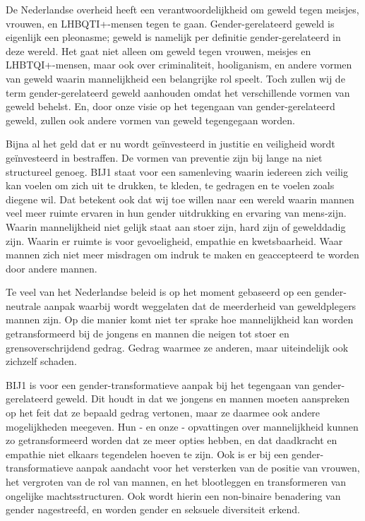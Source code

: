 De Nederlandse overheid heeft een verantwoordelijkheid om geweld tegen
meisjes, vrouwen, en LHBQTI+-mensen tegen te gaan. Gender-gerelateerd
geweld is eigenlijk een pleonasme; geweld is namelijk per definitie
gender-gerelateerd in deze wereld. Het gaat niet alleen om geweld tegen
vrouwen, meisjes en LHBTQI+-mensen, maar ook over criminaliteit,
hooliganism, en andere vormen van geweld waarin mannelijkheid een
belangrijke rol speelt. Toch zullen wij de term gender-gerelateerd
geweld aanhouden omdat het verschillende vormen van geweld behelst. En,
door onze visie op het tegengaan van gender-gerelateerd geweld, zullen
ook andere vormen van geweld tegengegaan worden.

Bijna al het geld dat er nu wordt geïnvesteerd in justitie en veiligheid
wordt geïnvesteerd in bestraffen. De vormen van preventie zijn bij lange
na niet structureel genoeg. BIJ1 staat voor een samenleving waarin
iedereen zich veilig kan voelen om zich uit te drukken, te kleden, te
gedragen en te voelen zoals diegene wil. Dat betekent ook dat wij toe
willen naar een wereld waarin mannen veel meer ruimte ervaren in hun
gender uitdrukking en ervaring van mens-zijn. Waarin mannelijkheid niet
gelijk staat aan stoer zijn, hard zijn of gewelddadig zijn. Waarin er
ruimte is voor gevoeligheid, empathie en kwetsbaarheid. Waar mannen zich
niet meer misdragen om indruk te maken en geaccepteerd te worden door
andere mannen.

Te veel van het Nederlandse beleid is op het moment gebaseerd op een
gender-neutrale aanpak waarbij wordt weggelaten dat de meerderheid van
geweldplegers mannen zijn. Op die manier komt niet ter sprake hoe
mannelijkheid kan worden getransformeerd bij de jongens en mannen die
neigen tot stoer en grensoverschrijdend gedrag. Gedrag waarmee ze
anderen, maar uiteindelijk ook zichzelf schaden.

BIJ1 is voor een gender-transformatieve aanpak bij het tegengaan van
gender-gerelateerd geweld. Dit houdt in dat we jongens en mannen moeten
aanspreken op het feit dat ze bepaald gedrag vertonen, maar ze daarmee
ook andere mogelijkheden meegeven. Hun - en onze - opvattingen over
mannelijkheid kunnen zo getransformeerd worden dat ze meer opties
hebben, en dat daadkracht en empathie niet elkaars tegendelen hoeven te
zijn. Ook is er bij een gender-transformatieve aanpak aandacht voor het
versterken van de positie van vrouwen, het vergroten van de rol van
mannen, en het blootleggen en transformeren van ongelijke
machtsstructuren. Ook wordt hierin een non-binaire benadering van gender
nagestreefd, en worden gender en seksuele diversiteit erkend.

